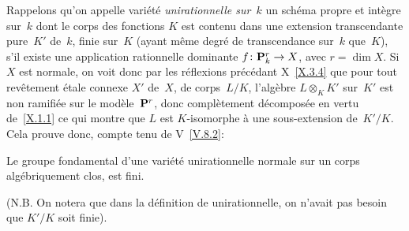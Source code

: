 Rappelons qu'on appelle vari\'et\'e \emph{unirationnelle sur~$k$}
un sch\'ema propre et int\`egre sur~$k$ dont le corps des
fonctions $K$ est contenu dans une extension transcendante pure~$K'$
de~$k$, finie sur~$K$ (\ie ayant m\^eme degr\'e de transcendance
sur~$k$ que~$K$), \ie s'il existe une application rationnelle
dominante $f\colon\PP_k^r\to X$, avec $r=\dim X$. Si $X$ est normale,
on voit donc par les r\'eflexions pr\'ec\'edant X~\ref{X.3.4}
que pour tout rev\^etement \'etale connexe $X'$ de~$X$, de
corps~$L/K$, l'alg\`ebre $L\otimes_K K'$ sur~$K'$ est non
ramifi\'ee sur le mod\`ele~$\mathbf{P}^r$, donc compl\`etement
d\'ecompos\'ee en vertu de~\ref{X.1.1} ce qui montre que $L$ est
$K$-isomorphe \`a une sous-extension de~$K'/K$. Cela prouve donc,
compte tenu de V~\ref{V.8.2}:

\begin{corollaire}
\label{XI.1.3}
Le groupe fondamental d'une vari\'et\'e unirationnelle normale sur
un corps al\-g\'e\-bri\-quement clos, est fini.
\end{corollaire}

(N.B. On notera que dans la d\'efinition de \og unirationnelle\fg, on
n'avait pas besoin que $K'/K$ soit finie).

